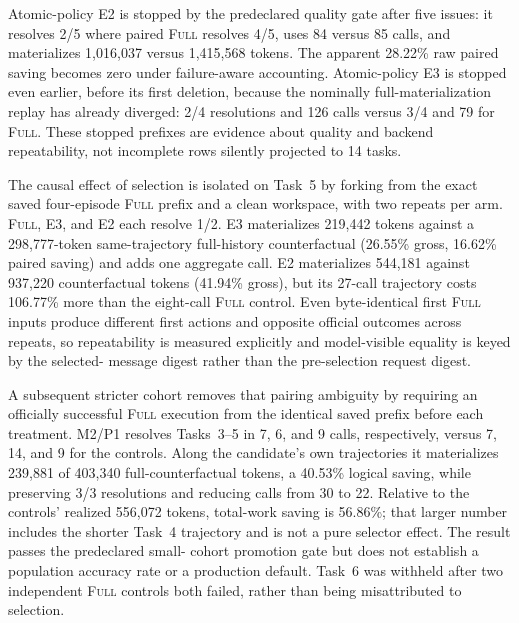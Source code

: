 \documentclass[11pt]{article}
\begin{document}
Atomic-policy E2 is stopped by the predeclared quality gate after five issues: it
resolves 2/5 where paired \textsc{Full} resolves 4/5, uses 84 versus 85 calls,
and materializes 1,016,037 versus 1,415,568 tokens.  The apparent 28.22\% raw
paired saving becomes zero under failure-aware accounting.  Atomic-policy E3 is
stopped even earlier, before its first deletion, because the nominally
full-materialization replay has already diverged: 2/4 resolutions and 126 calls
versus 3/4 and 79 for \textsc{Full}.  These stopped prefixes are evidence about
quality and backend repeatability, not incomplete rows silently projected to
14 tasks.

The causal effect of selection is isolated on Task~5 by forking from the exact
saved four-episode \textsc{Full} prefix and a clean workspace, with two repeats
per arm.  \textsc{Full}, E3, and E2 each resolve 1/2.  E3 materializes 219,442
tokens against a 298,777-token same-trajectory full-history counterfactual
(26.55\% gross, 16.62\% paired saving) and adds one aggregate call.  E2
materializes 544,181 against 937,220 counterfactual tokens (41.94\% gross), but
its 27-call trajectory costs 106.77\% more than the eight-call \textsc{Full}
control.  Even byte-identical first \textsc{Full} inputs produce different
first actions and opposite official outcomes across repeats, so repeatability
is measured explicitly and model-visible equality is keyed by the selected-
message digest rather than the pre-selection request digest.

A subsequent stricter cohort removes that pairing ambiguity by requiring an
officially successful \textsc{Full} execution from the identical saved prefix
before each treatment.  M2/P1 resolves Tasks~3--5 in 7, 6, and 9 calls,
respectively, versus 7, 14, and 9 for the controls.  Along the candidate's own
trajectories it materializes 239,881 of 403,340 full-counterfactual tokens, a
40.53\% logical saving, while preserving 3/3 resolutions and reducing calls
from 30 to 22.  Relative to the controls' realized 556,072 tokens, total-work
saving is 56.86\%; that larger number includes the shorter Task~4 trajectory
and is not a pure selector effect.  The result passes the predeclared small-
cohort promotion gate but does not establish a population accuracy rate or a
production default.  Task~6 was withheld after two independent \textsc{Full}
controls both failed, rather than being misattributed to selection.
\end{document}
